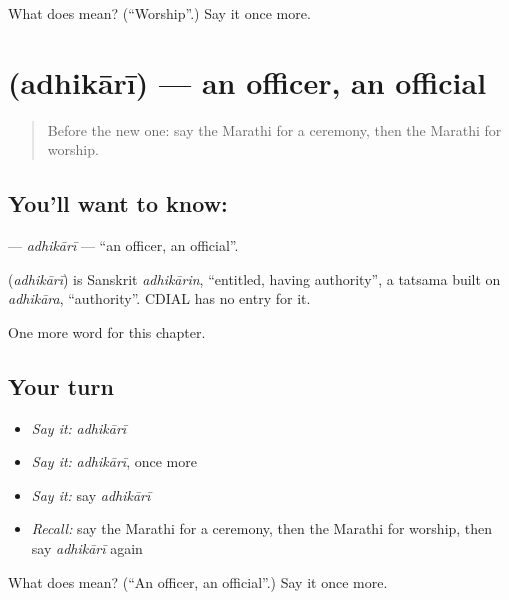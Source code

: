 \begin{tcolorbox}[breakable,colback=teal!4,colframe=teal!35!black,title={Before you move on}]
What does  mean? (\textquotedblleft{}Worship\textquotedblright{}.) Say it once more.
\end{tcolorbox}
\section[\texorpdfstring{\mr{अधिकारी} (adhikārī)}{अधिकारी (adhikārī)}]{ (adhikārī) — an officer, an official}

\label{lesson:MR-C274-adhikari}



\begin{quote}
Before the new one: say the Marathi for a ceremony, then the Marathi for worship.
\end{quote}

\subsection*{You'll want to know: }
\textbf{} — \emph{adhikārī} — \textquotedblleft{}an officer, an official\textquotedblright{}.

\begin{cousinweb}
\textbf{} (\emph{adhikārī}) is Sanskrit \emph{adhikārin}, \textquotedblleft{}entitled, having authority\textquotedblright{}, a tatsama built on \emph{adhikāra}, \textquotedblleft{}authority\textquotedblright{}. CDIAL has no entry for it.
\end{cousinweb}

\begin{grammarlens}[title={What you've built}]
One more word for this chapter.
\end{grammarlens}

\subsection*{Your turn}
\begin{itemize}
\raggedright
  \item \emph{Say it:} \emph{adhikārī}
  \item \emph{Say it:} \emph{adhikārī}, once more
  \item \emph{Say it:} say \emph{adhikārī}
  \item \emph{Recall:} say the Marathi for a ceremony, then the Marathi for worship, then say \emph{adhikārī} again
\end{itemize}

\begin{tcolorbox}[breakable,colback=teal!4,colframe=teal!35!black,title={Before you move on}]
What does  mean? (\textquotedblleft{}An officer, an official\textquotedblright{}.) Say it once more.
\end{tcolorbox}
